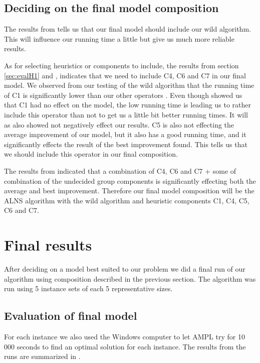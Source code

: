 \documentclass[../main.tex]{subfiles}
\begin{document}
\subsection{Deciding on the final model composition}
\label{sec:iniObs}
The results from  tells us that our final model should include our wild algorithm. 
This will influence our running time a little but give us much more reliable results.
\par
As for selecting heuristics or components to include, the results from section \ref{sec:evalH1} and , indicates that we need to include C4, C6 and C7 in our final model.
We observed from our testing of the wild algorithm that the running time of C1 is significantly lower than our other operators . Even though  showed us that C1 had no effect on the model, the low running time is leading us to rather include this operator than not to get us a little bit better running times.
It will as  also showed not negatively effect our results.
C5 is also not effecting the average improvement of our model, but it also has a good running time, and it significantly effects the result of the best improvement found. This tells us that we should include this operator in our final composition. \par
The results from  indicated that a combination of C4, C6 and C7 + some of combination of the undecided group components is significantly effecting both the average and best improvement. Therefore our final model composition will be the ALNS algorithm with the wild algorithm and heuristic components C1, C4, C5, C6 and C7.

\section{Final results}
\label{sec:finRes}
After deciding on a model best suited to our problem we did a final run of our algorithm using composition described in the previous section.
The algorithm was run using 5 instance sets of each 5 representative sizes. 
\subsection{Evaluation of final model}
\label{sec:finRes}
For each instance we also used the Windows computer to let AMPL try for 10 000 seconds to find an optimal solution for each instance.
The results from the runs are summarized in . 
\end{document}
